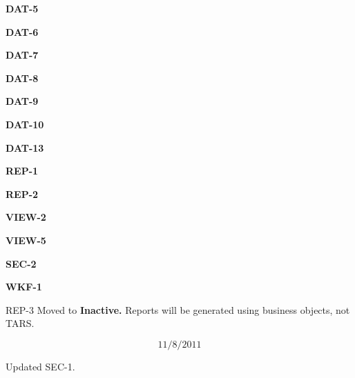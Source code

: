 \documentclass{article}
\begin{document}
\noindent \textbf{DAT-5}

\noindent \textbf{DAT-6}

\noindent \textbf{DAT-7}

\noindent \textbf{DAT-8}

\noindent \textbf{DAT-9}

\noindent \textbf{DAT-10}

\noindent \textbf{DAT-13}

\noindent \textbf{REP-1}

\noindent \textbf{REP-2}

\noindent \textbf{VIEW-2}

\noindent \textbf{VIEW-5}

\noindent \textbf{SEC-2}

\noindent \textbf{WKF-1}

  

 REP-3 Moved to \textbf{Inactive. }Reports will be generated using business objects, not TARS.

\noindent 
\[11/8/2011\] 

 Updated SEC-1. 

\textbf{ }
\end{document}
